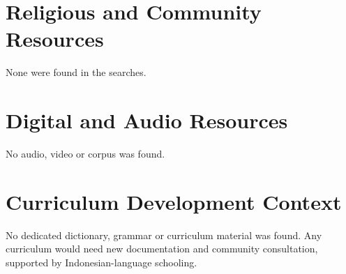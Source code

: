 \documentclass[12pt]{article}
\begin{document}
\section{Religious and Community Resources}
None were found in the searches.

\section{Digital and Audio Resources}
No audio, video or corpus was found.

\section{Curriculum Development Context}
No dedicated dictionary, grammar or curriculum material was found. Any curriculum would need new documentation and community consultation, supported by Indonesian-language schooling.
\end{document}
